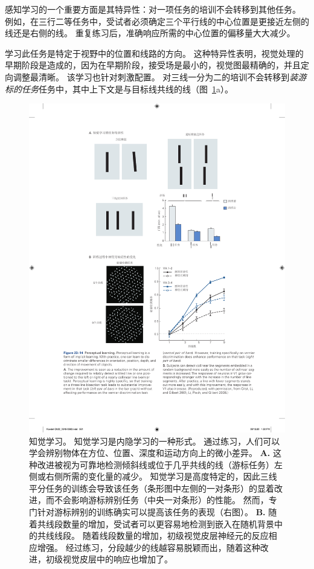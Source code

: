 感知学习的一个重要方面是其特异性：对一项任务的培训不会转移到其他任务。
例如，在三行二等任务中，受试者必须确定三个平行线的中心位置是更接近左侧的线还是右侧的线。
重复练习后，准确响应所需的中心位置的偏移量大大减少。


学习此任务是特定于视野中的位置和线路的方向。
这种特异性表明，视觉处理的早期阶段是造成的，因为在早期阶段，接受场是最小的，视觉图最精确的，并且定向调整最清晰。
该学习也针对刺激配置。
对三线一分为二的培训不会转移到\textit{装游标的任务}任务中，其中上下文是与目标线共线的线（图~\ref{fig:23_14}a）。


\begin{figure}[htbp]
	\centering
	\includegraphics[width=0.88\linewidth]{chap23/fig_23_14}
	\caption{知觉学习。
		知觉学习是内隐学习的一种形式。
		通过练习，人们可以学会辨别物体在方位、位置、深度和运动方向上的微小差异。
		\textbf{A.} 这种改进被视为可靠地检测倾斜线或位于几乎共线的线（游标任务）左侧或右侧所需的变化量的减少。
		知觉学习是高度特定的，因此三线平分任务的训练会导致该任务（条形图中左侧的一对条形）的显着改进，而不会影响游标辨别任务（中央一对条形）的性能。
		然而，专门针对游标辨别的训练确实可以提高该任务的表现（右图）。
		\textbf{B.} 随着共线段数量的增加，受试者可以更容易地检测到嵌入在随机背景中的共线线段。
		随着线段数量的增加，初级视觉皮层神经元的反应相应增强。
		经过练习，分段越少的线越容易脱颖而出，随着这种改进，初级视觉皮层中的响应也增加了\cite{crist2001learning,li2008learning}。}
	\label{fig:23_14}
\end{figure}


